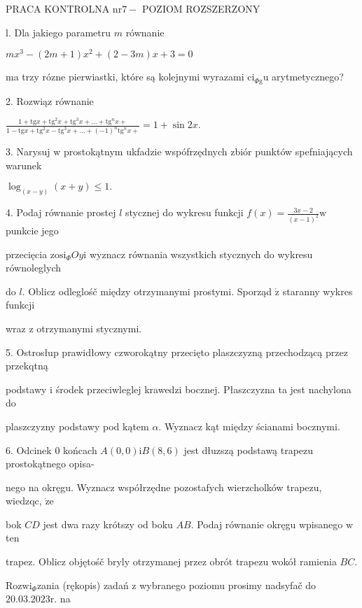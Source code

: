 \documentclass[a4paper,12pt]{article}
\begin{document}
PRACA KONTROLNA $\mathrm{n}\mathrm{r} 7-$ POZIOM ROZSZERZONY

l. Dla jakiego parametru $m$ równanie

$mx^{3}-(2m+1)x^{2}+(2-3m)x+3=0$

ma trzy rózne pierwiastki, które są kolejnymi wyrazami $\mathrm{c}\mathrm{i}_{\Phi \mathrm{g}}\mathrm{u}$ arytmetycznego?

2. Rozwiąz równanie

$\displaystyle \frac{1+\mathrm{t}\mathrm{g}x+\mathrm{t}\mathrm{g}^{2}x+\mathrm{t}\mathrm{g}^{3}x+\ldots+\mathrm{t}\mathrm{g}^{n}x+}{1-\mathrm{t}\mathrm{g}x+\mathrm{t}\mathrm{g}^{2}x-\mathrm{t}\mathrm{g}^{3}x+\ldots+(-1)^{n}\mathrm{t}\mathrm{g}^{n}x+}=1+\sin 2x.$

3. Narysuj $\mathrm{w}$ prostokątnym ukfadzie wspófrzędnych zbiór punktów spefniających warunek

$\log_{(x-y)}(x+y)\leq 1.$

4. Podaj równanie prostej $l$ stycznej do wykresu funkcji $f(x)=\displaystyle \frac{3x-2}{(x-1)^{2}} \mathrm{w}$ punkcie jego

przecięcia $\mathrm{z}\mathrm{o}\mathrm{s}\mathrm{i}_{\Phi}Oy\mathrm{i}$ wyznacz równania wszystkich stycznych do wykresu równoleglych

do $l$. Oblicz odleglośč między otrzymanymi prostymi. Sporząd $\acute{\mathrm{z}}$ staranny wykres funkcji

wraz $\mathrm{z}$ otrzymanymi stycznymi.

5. Ostrosłup prawidłowy czworokątny przecięto plaszczyzną przechodzącą przez przekqtną

podstawy $\mathrm{i}$ środek przeciwleglej krawedzi bocznej. Płaszczyzna ta jest nachylona do

plaszczyzny podstawy pod kątem $\alpha$. Wyznacz kąt między ścianami bocznymi.

6. Odcinek $0$ końcach $A(0,0)\mathrm{i}B(8,6)$ jest dłuzszą podstawą trapezu prostokątnego opisa-

nego na okręgu. Wyznacz współrzędne pozostafych wierzcholków trapezu, wiedzqc, $\dot{\mathrm{z}}\mathrm{e}$

bok $CD$ jest dwa razy krótszy od boku $AB$. Podaj równanie okręgu wpisanego $\mathrm{w}$ ten

trapez. Oblicz objętośč bryly otrzymanej przez obrót trapezu wokół ramienia $BC.$

$\mathrm{R}\mathrm{o}\mathrm{z}\mathrm{w}\mathrm{i}_{\Phi}$zania (rękopis) zadań $\mathrm{z}$ wybranego poziomu prosimy nadsyfač do $20.03.2023\mathrm{r}$. na
\end{document}
